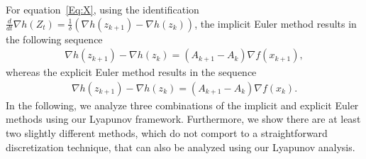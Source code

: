 \documentclass[11pt]{article}
\theoremstyle{plain}
\begin{document}
 For equation~\eqref{Eq:X}, using the identification $\frac{d}{dt} \nabla h(Z_t) = \frac{1}{\delta}(\nabla h(z_{k+1}) - \nabla h(z_k))$, the implicit Euler method results in the following sequence
 \begin{align*}
\nabla h(z_{k+1}) - \nabla h(z_k) = (A_{k+1} - A_k) \nabla f(x_{k+1}),
 \end{align*}
 whereas the explicit Euler method results in the sequence
 \begin{align*}
\nabla h(z_{k+1}) - \nabla h(z_k) = (A_{k+1} - A_k) \nabla f(x_{k}).
 \end{align*}
 In the following, we analyze three combinations of the implicit and explicit Euler methods using our Lyapunov framework. Furthermore, we show there are at least two slightly different methods, which do not comport to a straightforward discretization technique, that can also be analyzed using our Lyapunov analysis. 
\end{document}
